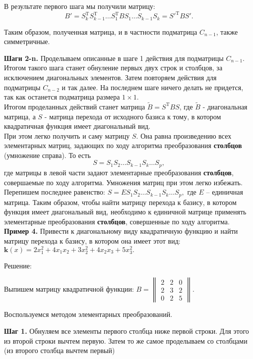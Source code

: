 В результате первого шага мы получили матрицу: $$ B'=S^{\text{T}}_{k} S^{\text{T}}_{k-1} \ldots S^{\text{T}}_1BS_1\ldots S_{k-1}S_k=S'^{\text{T}}BS'.$$

Таким образом, полученная матрица, и в частности подматрица $C_{n-1}$, также симметричные.

\textbf{Шаги 2-n.} Проделываем описанные в шаге 1 действия для подматрицы $C_{n-1}$. Итогом такого шага станет обнуление первых двух строк и столбцов, за исключением диагональных элементов. Затем повторяем действия для подматрицы $C_{n-2}$ и так далее. На последнем шаге ничего делать не придется, так как останется подматрица размера $1\times1$.\\

Итогом проделанных действий станет матрица $\widetilde B = S^{\text{T}}BS$, где $\widetilde B$ - диагональная матрица, а  $S$ - матрица перехода от исходного базиса к тому, в котором квадратичная функция имеет диагональный вид.\\

При этом легко получить и саму матрицу $S$. Она равна произведению всех элементарных матриц, задающих по ходу алгоритма преобразования \textbf{столбцов} (умножение справа). То есть $$S=S_1S_2\ldots S_{k-1}S_{k}\ldots S_p,$$ где матрицы в левой части задают элементарные преобразования \textbf{столбцов}, совершаемые по ходу алгоритма. Умножения матриц при этом легко избежать. Перепишем последнее равенство: $S=ES_1S_2\ldots S_{k-1}S_{k}\ldots S_p,$ где $E$ -- единичная матрица. Таким образом, чтобы найти матрицу перехода к базису, в котором функция имеет диагональный вид, необходимо к единичной матрице применять элементарные преобразования \textbf{столбцов}, совершенные по ходу алгоритма.\\

\textbf{Пример 4.} Привести к диагональному виду квадратичную функцию и найти матрицу перехода к базису, в котором она имеет этот вид: $\mathbf{k}(x)=2x^2_1+4x_1x_2+3x^2_2+4x_2x_3+5x^2_3.$
\begin{center}
Решение:
\end{center}

Выпишем матрицу квадратичной функции: $B=\begin{Vmatrix}
2 & 2 & 0 \\
2 & 3 & 2 \\
0 & 2 & 5
\end{Vmatrix}.$

Воспользуемся методом элементарных преобразований.

\textbf{Шаг 1.} Обнуляем все элементы первого столбца ниже первой строки. Для этого из второй строки вычтем первую. Затем то же самое проделываем со столбцами (из второго столбца вычтем первый)

